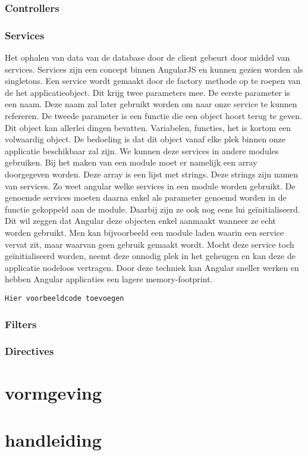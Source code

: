 \documentclass[a4paper,11pt]{article}
\begin{document}
\subsubsection{Controllers}

\subsubsection{Services}
Het ophalen van data van de database door de client gebeurt door middel van services. Services zijn een concept binnen AngularJS en kunnen gezien worden als singletons. Een service wordt gemaakt door de factory methode op te roepen van de het applicatieobject. Dit krijg twee parameters mee. De eerste parameter is een naam. Deze naam zal later gebruikt worden om naar onze service te kunnen refereren. De tweede parameter is een functie die een object hoort terug te geven. Dit object kan allerlei dingen bevatten. Variabelen, functies, het is kortom een volwaardig object. De bedoeling is dat dit object vanaf elke plek binnen onze applicatie beschikbaar zal zijn. We kunnen deze services in andere modules gebruiken. Bij het maken van een module moet er namelijk een array doorgegeven worden. Deze array is een lijst met strings. Deze strings zijn namen van services. Zo weet angular welke services in een module worden gebruikt. De genoemde services moeten daarna enkel als parameter genoemd worden in de functie gekoppeld aan de module. Daarbij zijn ze ook nog eens lui geïnitialiseerd. Dit wil zeggen dat Angular deze objecten enkel aanmaakt wanneer ze echt worden gebruikt. Men kan bijvoorbeeld een module laden waarin een service vervat zit, maar waarvan geen gebruik gemaakt wordt. Mocht deze service toch geïnitialiseerd worden, neemt deze onnodig plek in het geheugen en kan deze de applicatie nodeloos vertragen. Door deze techniek kan Angular sneller werken en hebben Angular applicaties een lagere memory-footprint.

\begin{verbatim}
Hier voorbeeldcode toevoegen
\end{verbatim}

\subsubsection{Filters}

\subsubsection{Directives}

\section{vormgeving}



\section{handleiding}
\end{document}
